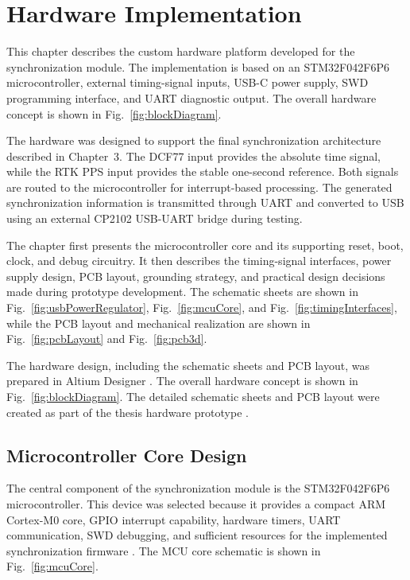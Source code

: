 
\chapter{Hardware Implementation\label{chap:hardwareImplementation}}

This chapter describes the custom hardware platform developed for the synchronization module. The implementation is based on an STM32F042F6P6 microcontroller, external timing-signal inputs, USB-C power supply, SWD programming interface, and UART diagnostic output. The overall hardware concept is shown in Fig.~\ref{fig:blockDiagram}.

The hardware was designed to support the final synchronization architecture described in Chapter~3. The DCF77 input provides the absolute time signal, while the RTK PPS input provides the stable one-second reference. Both signals are routed to the microcontroller for interrupt-based processing. The generated synchronization information is transmitted through UART and converted to USB using an external CP2102 USB-UART bridge during testing.

The chapter first presents the microcontroller core and its supporting reset, boot, clock, and debug circuitry. It then describes the timing-signal interfaces, power supply design, PCB layout, grounding strategy, and practical design decisions made during prototype development. The schematic sheets are shown in Fig.~\ref{fig:usbPowerRegulator}, Fig.~\ref{fig:mcuCore}, and Fig.~\ref{fig:timingInterfaces}, while the PCB layout and mechanical realization are shown in Fig.~\ref{fig:pcbLayout} and Fig.~\ref{fig:pcb3d}.

The hardware design, including the schematic sheets and PCB layout, was prepared in Altium Designer \cite{altiumDesignerDocs}. The overall hardware concept is shown in Fig.~\ref{fig:blockDiagram}. The detailed schematic sheets and PCB layout were created as part of the thesis hardware prototype \cite{PCBtimesynco}.

\section{Microcontroller Core Design}

The central component of the synchronization module is the STM32F042F6P6 microcontroller. This device was selected because it provides a compact ARM Cortex-M0 core, GPIO interrupt capability, hardware timers, UART communication, SWD debugging, and sufficient resources for the implemented synchronization firmware \cite{stm32F042Datasheet,stm32F0ReferenceManual}. The MCU core schematic is shown in Fig.~\ref{fig:mcuCore}.

